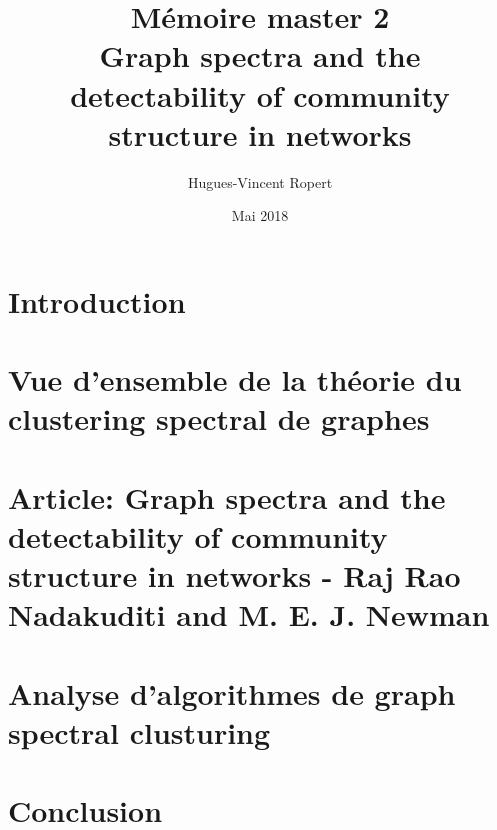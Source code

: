 \documentclass{article} %
\title{Mémoire master 2 \\ Graph spectra and the detectability of community structure in networks}
\author{Hugues-Vincent Ropert}
\date{Mai 2018}
\begin{document}
\maketitle
\newpage

\tableofcontents
\newpage

\part{Introduction}

\part{Vue d'ensemble de la théorie du clustering spectral de graphes}



\part{Article: Graph spectra and the detectability of community structure in networks - Raj Rao Nadakuditi and M. E. J. Newman}




\nocite{*}

\part{Analyse d'algorithmes de graph spectral clusturing}



\appendix

\part{Conclusion}




\end{document}
